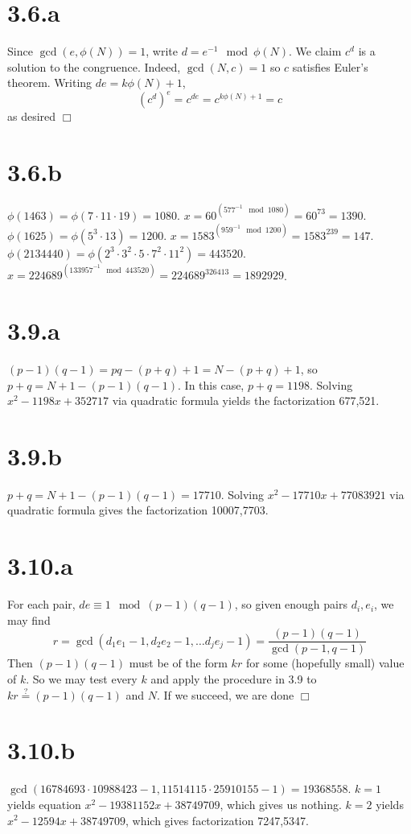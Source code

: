 \documentclass{article}
\begin{document}
\section*{3.6.a}
Since $\gcd(e,\phi(N)) = 1$, write $d = e^{-1} \mod \phi(N)$. We claim $c^d$ is a solution to the congruence. Indeed, $\gcd(N,c) = 1$ so $c$ satisfies Euler's theorem. Writing $de = k\phi(N) + 1$,
$$(c^d)^e = c^{de} = c^{k\phi(N)+1} = c$$
as desired $\Box$

\section*{3.6.b}
$\phi(1463) = \phi(7\cdot11\cdot19) = 1080$. $x = 60^{(577^{-1} \mod 1080)} = 60^{73} = 1390$.\\
$\phi(1625) = \phi(5^3 \cdot 13) = 1200$. $x = 1583^{(959^{-1} \mod 1200)} = 1583^{239} = 147$.\\
$\phi(2134440) = \phi(2^3 \cdot 3^2 \cdot 5 \cdot 7^2 \cdot 11^2) = 443520$. $x = 224689^{(133957^{-1} \mod 443520)} = 224689^{326413} = 1892929$.

\section*{3.9.a}
$(p-1)(q-1) = pq - (p+q) + 1 = N - (p+q) + 1$, so $p+q = N + 1 - (p-1)(q-1)$. In this case, $p+q = 1198$. Solving $x^2 - 1198x + 352717$ via quadratic formula yields the factorization 677,521.

\section*{3.9.b}
$p+q = N + 1 - (p-1)(q-1) = 17710$. Solving $x^2 - 17710x + 77083921$ via quadratic formula gives the factorization 10007,7703.

\section*{3.10.a}
For each pair, $de \equiv 1 \mod (p-1)(q-1)$, so given enough pairs $d_i,e_i$, we may find
$$r = \gcd(d_1e_1-1, d_2e_2-1, \dots d_je_j-1) = \frac{(p-1)(q-1)}{\gcd(p-1,q-1)}$$
Then $(p-1)(q-1)$ must be of the form $kr$ for some (hopefully small) value of $k$. So we may test every $k$ and apply the procedure in 3.9 to $kr \overset{?}{=} (p-1)(q-1)$ and $N$. If we succeed, we are done $\Box$

\section*{3.10.b}
$\gcd(16784693\cdot10988423-1,11514115\cdot25910155-1) = 19368558$. $k=1$ yields equation $x^2 - 19381152x + 38749709$, which gives us nothing. $k=2$ yields $x^2 - 12594x + 38749709$, which gives factorization 7247,5347.
\end{document}
